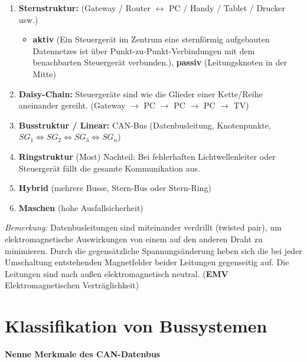 \begin{enumerate}
\item
  \textbf{Sternstruktur:} (Gateway / Router $\leftrightarrow$ PC /
  Handy / Tablet / Drucker usw.)

  \begin{itemize}
  \item
    \textbf{aktiv} (Ein Steuergerät im Zentrum eine sternförmig
    aufgebauten Datennetzes ist über Punkt-zu-Punkt-Verbindungen mit dem
    benachbarten Steuergerät verbunden.), \textbf{passiv}
    (Leitungsknoten in der Mitte)
  \end{itemize}
\item
  \textbf{Daisy-Chain:} Steuergeräte sind wie die Glieder einer
  Kette/Reihe aneinander gereiht. (Gateway $\to$ PC $\to$ PC $\to$
  PC $\to$ TV)
\item
  \textbf{Busstruktur / Linear:} CAN-Bus (Datenbusleitung, Knotenpunkte,
  $SG_1 \Longleftrightarrow SG_2 \Longleftrightarrow SG_3 \Longleftrightarrow SG_n$)
\item
  \textbf{Ringstruktur} (Most) Nachteil: Bei fehlerhaften
  Lichtwellenleiter oder Steuergerät fällt die gesamte Kommunikation
  aus.
\item
  \textbf{Hybrid} (mehrere Busse, Stern-Bus oder Stern-Ring)
\item
  \textbf{Maschen} (hohe Ausfallsicherheit)
\end{enumerate}

\emph{Bemerkung:} Datenbusleitungen sind miteinander verdrillt (twisted
pair), um elektromagnetische Auswirkungen von einem auf den anderen
Draht zu minimieren. Durch die gegensätzliche Spannungsänderung heben
sich die bei jeder Umschaltung entstehenden Magnetfelder beider
Leitungen gegenseitig auf. Die Leitungen sind nach außen
elektromagnetisch neutral. (\textbf{EMV} Elektromagnetischen
Verträglichkeit)

\newpage

\section{Klassifikation von
Bussystemen}\label{klassifikation-von-bussystemen}

\textbf{Nenne Merkmale des CAN-Datenbus}

